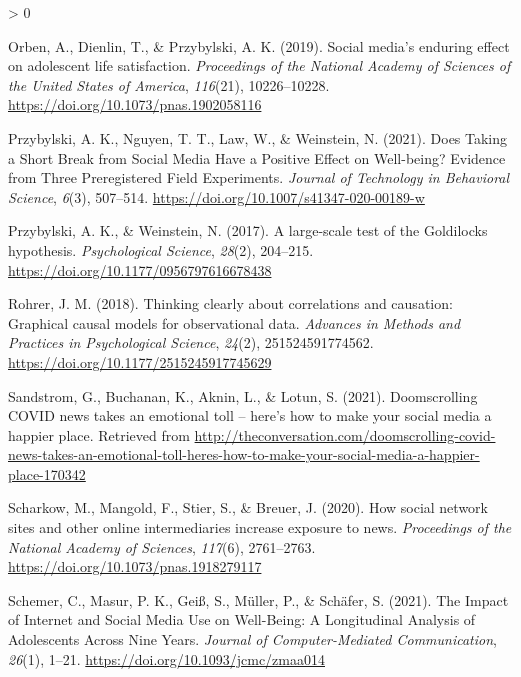 \documentclass[
  english,
  man,mask,floatsintext]{apa6}
\newlength{\cslhangindent}
\newenvironment{CSLReferences}[2] %
 {%
  \setlength{\parindent}{0pt}
  \ifodd #1 \everypar{\setlength{\hangindent}{\cslhangindent}}\ignorespaces\fi
  \ifnum #2 > 0
  \setlength{\parskip}{#2\baselineskip}
  \fi
 }%
 {}
\begin{document}
\begin{CSLReferences}{1}{0}
\leavevmode\hypertarget{ref-orbenSocialMediaEnduring2019}{}%
Orben, A., Dienlin, T., \& Przybylski, A. K. (2019). Social media's enduring effect on adolescent life satisfaction. \emph{Proceedings of the National Academy of Sciences of the United States of America}, \emph{116}(21), 10226--10228. \url{https://doi.org/10.1073/pnas.1902058116}

\leavevmode\hypertarget{ref-przybylskiDoesTakingShort2021a}{}%
Przybylski, A. K., Nguyen, T. T., Law, W., \& Weinstein, N. (2021). Does {Taking} a {Short} {Break} from {Social} {Media} {Have} a {Positive} {Effect} on {Well}-being? {Evidence} from {Three} {Preregistered} {Field} {Experiments}. \emph{Journal of Technology in Behavioral Science}, \emph{6}(3), 507--514. \url{https://doi.org/10.1007/s41347-020-00189-w}

\leavevmode\hypertarget{ref-przybylskiLargescaleTestGoldilocks2017}{}%
Przybylski, A. K., \& Weinstein, N. (2017). A large-scale test of the {Goldilocks} hypothesis. \emph{Psychological Science}, \emph{28}(2), 204--215. \url{https://doi.org/10.1177/0956797616678438}

\leavevmode\hypertarget{ref-rohrerThinkingClearlyCorrelations2018}{}%
Rohrer, J. M. (2018). Thinking clearly about correlations and causation: {Graphical} causal models for observational data. \emph{Advances in Methods and Practices in Psychological Science}, \emph{24}(2), 251524591774562. \url{https://doi.org/10.1177/2515245917745629}

\leavevmode\hypertarget{ref-sandstromDoomscrollingCOVIDNews2021}{}%
Sandstrom, G., Buchanan, K., Aknin, L., \& Lotun, S. (2021). Doomscrolling {COVID} news takes an emotional toll -- here's how to make your social media a happier place. Retrieved from \url{http://theconversation.com/doomscrolling-covid-news-takes-an-emotional-toll-heres-how-to-make-your-social-media-a-happier-place-170342}

\leavevmode\hypertarget{ref-scharkowHowSocialNetwork2020}{}%
Scharkow, M., Mangold, F., Stier, S., \& Breuer, J. (2020). How social network sites and other online intermediaries increase exposure to news. \emph{Proceedings of the National Academy of Sciences}, \emph{117}(6), 2761--2763. \url{https://doi.org/10.1073/pnas.1918279117}

\leavevmode\hypertarget{ref-schemerImpactInternetSocial2021}{}%
Schemer, C., Masur, P. K., Geiß, S., Müller, P., \& Schäfer, S. (2021). The {Impact} of {Internet} and {Social} {Media} {Use} on {Well}-{Being}: {A} {Longitudinal} {Analysis} of {Adolescents} {Across} {Nine} {Years}. \emph{Journal of Computer-Mediated Communication}, \emph{26}(1), 1--21. \url{https://doi.org/10.1093/jcmc/zmaa014}


\end{CSLReferences}
\end{document}
